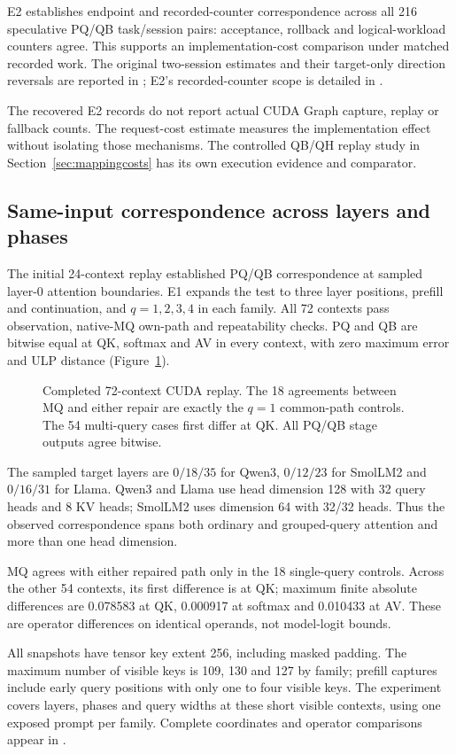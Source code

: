E2 establishes endpoint and recorded-counter correspondence across all 216 speculative PQ/QB task/session pairs: acceptance, rollback and logical-workload counters agree. This supports an implementation-cost comparison under matched recorded work. The original two-session estimates and their target-only direction reversals are reported in ; E2's recorded-counter scope is detailed in .

The recovered E2 records do not report actual CUDA Graph capture, replay or fallback counts. The request-cost estimate measures the implementation effect without isolating those mechanisms. The controlled QB/QH replay study in Section~\ref{sec:mappingcosts} has its own execution evidence and comparator.


\subsection{Same-input correspondence across layers and phases}
\label{sec:numeric}
The initial 24-context replay established PQ/QB correspondence at sampled layer-0 attention boundaries. E1 expands the test to three layer positions, prefill and continuation, and $q=1,2,3,4$ in each family. All 72 contexts pass observation, native-MQ own-path and repeatability checks. PQ and QB are bitwise equal at QK, softmax and AV in every context, with zero maximum error and ULP distance (Figure~\ref{fig:numeric}).

\begin{figure}[t]\centering
\resizebox{\columnwidth}{!}{}
\caption{Completed 72-context CUDA replay. The 18 agreements between MQ and either repair are exactly the $q=1$ common-path controls. The 54 multi-query cases first differ at QK. All PQ/QB stage outputs agree bitwise.}
\label{fig:numeric}
\end{figure}

The sampled target layers are $0/18/35$ for Qwen3, $0/12/23$ for SmolLM2 and $0/16/31$ for Llama. Qwen3 and Llama use head dimension 128 with 32 query heads and 8 KV heads; SmolLM2 uses dimension 64 with 32/32 heads. Thus the observed correspondence spans both ordinary and grouped-query attention and more than one head dimension.

MQ agrees with either repaired path only in the 18 single-query controls. Across the other 54 contexts, its first difference is at QK; maximum finite absolute differences are 0.078583 at QK, 0.000917 at softmax and 0.010433 at AV. These are operator differences on identical operands, not model-logit bounds.

All snapshots have tensor key extent 256, including masked padding. The maximum number of visible keys is 109, 130 and 127 by family; prefill captures include early query positions with only one to four visible keys. The experiment covers layers, phases and query widths at these short visible contexts, using one exposed prompt per family. Complete coordinates and operator comparisons appear in .
